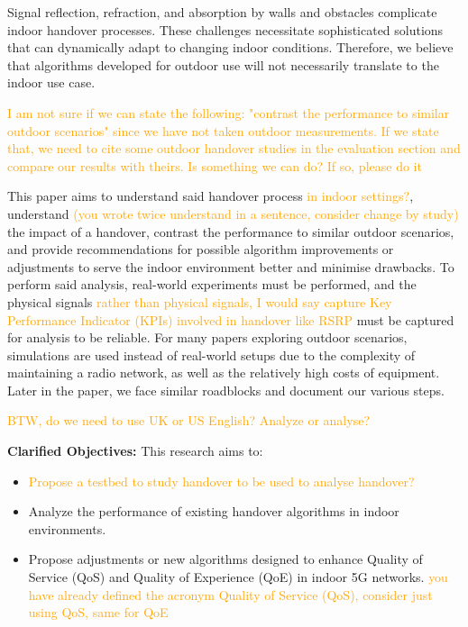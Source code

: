 Signal reflection, refraction, and absorption by walls and obstacles complicate indoor handover processes. These challenges necessitate sophisticated solutions that can dynamically adapt to changing indoor conditions. Therefore, we believe that algorithms developed for outdoor use will not necessarily translate to the indoor use case.

\textcolor{orange}{I am not sure if we can state the following: "contrast the performance to similar outdoor scenarios" since we have not taken outdoor measurements. If we state that, we need to cite some outdoor handover studies in the evaluation section and compare our results with theirs. Is something we can do? If so, please do it}

This paper aims to understand said handover process \textcolor{orange}{in indoor settings?}, understand \textcolor{orange}{(you wrote twice understand in a sentence, consider change by study)} the impact of a handover, contrast the performance to similar outdoor scenarios, and provide recommendations for possible algorithm improvements or adjustments to serve the indoor environment better and minimise drawbacks. To perform said analysis, real-world experiments must be performed, and the physical signals \textcolor{orange}{rather than physical signals, I would say capture Key Performance Indicator (KPIs) involved in handover like RSRP} must be captured for analysis to be reliable. For many papers exploring outdoor scenarios, simulations are used instead of real-world setups due to the complexity of maintaining a radio network, as well as the relatively high costs of equipment. Later in the paper, we face similar roadblocks and document our various steps.

\textcolor{orange}{BTW, do we need to use UK or US English? Analyze or analyse?}

\textbf{Clarified Objectives:} This research aims to:
\begin{itemize}
    \item \textcolor{orange}{Propose a testbed to study handover to be used to analyse handover?}
    \item Analyze the performance of existing handover algorithms in indoor environments.
    \item Propose adjustments or new algorithms designed to enhance Quality of Service (QoS) and Quality of Experience (QoE) in indoor 5G networks. \textcolor{orange}{you have already defined the acronym Quality of Service (QoS), consider just using QoS, same for QoE }
\end{itemize}

